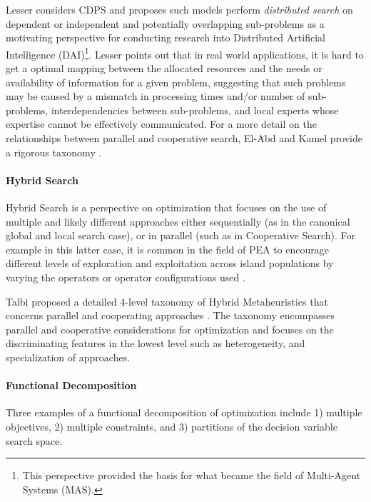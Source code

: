 Lesser \cite{Lesser1990} considers CDPS and proposes such models perform \emph{distributed search} on dependent or independent and potentially overlapping sub-problems as a motivating perspective for conducting research into Distributed Artificial Intelligence (DAI)\footnote{This perspective provided the basis for what became the field of Multi-Agent Systems (MAS).}. Lesser points out that in real world applications, it is hard to get a optimal mapping between the allocated resources and the needs or availability of information for a given problem, suggesting that such problems may be caused by a mismatch in processing times and/or number of sub-problems, interdependencies between sub-problems, and local experts whose expertise cannot be effectively communicated. For a more detail on the relationships between parallel and cooperative search, El-Abd and Kamel provide a rigorous taxonomy \cite{El-Abd2005}.
	
\paragraph{Hybrid Search}
Hybrid Search is a perspective on optimization that focuses on the use of multiple and likely different approaches either sequentially (as in the canonical global and local search case), or in parallel (such as in Cooperative Search). For example in this latter case, it is common in the field of PEA to encourage different levels of exploration and exploitation across island populations by varying the operators or operator configurations used \cite{Tanese1989, Adamidis1996}. 

Talbi proposed a detailed 4-level taxonomy of Hybrid Metaheuristics that concerns parallel and cooperating approaches \cite{Talbi2001}. The taxonomy encompasses parallel and cooperative considerations for optimization and focuses on the discriminating features in the lowest level such as heterogeneity, and specialization of approaches.
	
\paragraph{Functional Decomposition}
Three examples of a functional decomposition of optimization include 1) multiple objectives, 2) multiple constraints, and 3) partitions of the decision variable search space. 

